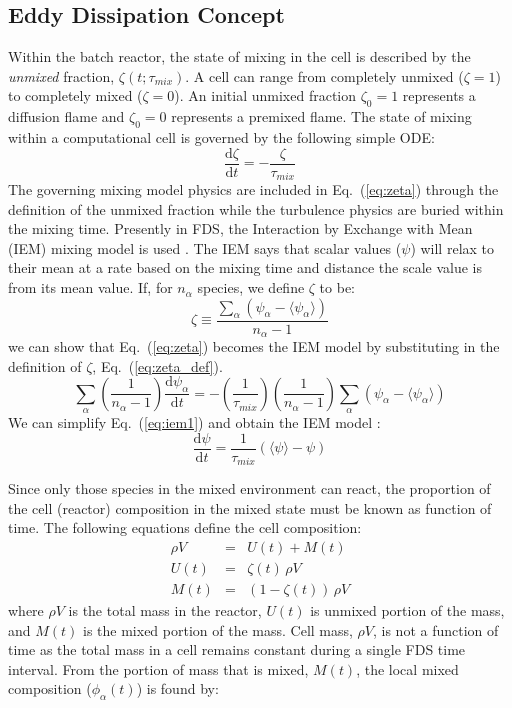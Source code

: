 \subsection{Eddy Dissipation Concept}
\label{sec:EDC} 
Within the batch reactor, the state of mixing in the cell is described by the \emph{unmixed} fraction, $\zeta(t;\tau_{mix})$. A cell can range from completely unmixed ($\zeta=1$) to completely mixed ($\zeta=0$). An initial unmixed fraction $\zeta_0=1$  represents a diffusion flame and $\zeta_0=0$ represents a premixed flame. The state of mixing within a computational cell is governed by the following simple ODE:
\begin{equation}\label{eq:zeta}
\frac{\mbox{d}\zeta}{\mbox{d}t}=-\frac{\zeta}{\tau_{mix}}
\end{equation}
The governing mixing model physics are included in Eq.~(\ref{eq:zeta}) through the definition of the unmixed fraction while the turbulence physics are buried within the mixing time. Presently in FDS, the Interaction by Exchange with Mean (IEM) mixing model is used \cite{fox2003}. The IEM says that scalar values ($\psi$) will relax to their mean at a rate based on the mixing time and distance the scale value is from its mean value.  If, for $n_{\alpha}$ species, we define $\zeta$ to be:
\begin{equation}\label{eq:zeta_def}
\zeta \equiv \frac{\displaystyle \sum_{\alpha}(\psi_{\alpha}- \langle \psi_{\alpha} \rangle )}{n_{\alpha} - 1}
\end{equation}
we can show that Eq.~(\ref{eq:zeta}) becomes the IEM model by substituting in the definition of $\zeta$, Eq.~(\ref{eq:zeta_def}).
\begin{equation}\label{eq:iem1}
\displaystyle \sum_{\alpha}\left(\frac{1}{n_{\alpha}-1}\right) \frac{\mbox{d}\psi_{\alpha}}{\mbox{d}t} = - \left(\frac{1}{\tau_{mix}}\right) \left(\frac{1}{n_{\alpha}-1} \right) \displaystyle \sum_{\alpha}(\psi_{\alpha}- \langle \psi_{\alpha} \rangle)
\end{equation}
We can simplify Eq.~(\ref{eq:iem1}) and obtain the IEM model \cite{fox2003}:
\begin{equation}\label{eq:iem2}
\frac{\mbox{d}\psi}{\mbox{d}t} = \frac{1}{\tau_{mix}}(\langle \psi \rangle - \psi)
\end{equation}
      
Since only those species in the mixed environment can react, the proportion of the cell (reactor) composition in the mixed state must be known as function of time. The following equations define the cell composition:
\begin{eqnarray}\label{eq:mixunmix}
\rho V &=& U(t) + M(t) \\
U(t) &=& \zeta(t)\,\rho V \\
M(t) &=& (1-\zeta(t))\,\rho V
\end{eqnarray} 
where $\rho V$ is the total mass in the reactor, $U(t)$ is unmixed portion of the mass, and $M(t)$ is the mixed portion of the mass. Cell mass, $\rho V$, is not a function of time as the total mass in a cell remains constant during a single FDS time interval. From the portion of mass that is mixed, $M(t)$, the local mixed composition ($\phi_{\alpha}(t)$) is found by:

